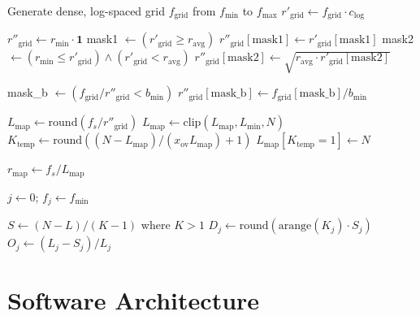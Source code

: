 \documentclass[final, 5p, times, twocolumn, number, sort&compress]{elsarticle}
\begin{document}
\begin{algorithm}[ht!]
\small
\caption{The Vectorized LTF Scheduler}
\label{alg:vectorized-ltf}


Generate dense, log-spaced grid $f_{\text{grid}}$ from $f_{\min}$ to $f_{\max}$\;
$r'_{\text{grid}} \gets f_{\text{grid}} \cdot c_{\log}$\;

$r''_{\text{grid}} \gets r_{\min} \cdot \mathbf{1}$\;
mask1 $\gets (r'_{\text{grid}} \ge r_{\text{avg}})$\;
$r''_{\text{grid}}[\text{mask1}] \gets r'_{\text{grid}}[\text{mask1}]$\;
mask2 $\gets (r_{\min} \le r'_{\text{grid}}) \land (r'_{\text{grid}} < r_{\text{avg}})$\;
$r''_{\text{grid}}[\text{mask2}] \gets \sqrt{r_{\text{avg}} \cdot r'_{\text{grid}}[\text{mask2}]}$\;

mask\_b $\gets (f_{\text{grid}} / r''_{\text{grid}} < b_{\min})$\;
$r''_{\text{grid}}[\text{mask\_b}] \gets f_{\text{grid}}[\text{mask\_b}] / b_{\min}$\;

$L_{\text{map}} \gets \text{round}(f_s / r''_{\text{grid}})$\;
$L_{\text{map}} \gets \text{clip}(L_{\text{map}}, L_{\min}, N)$\;
$K_{\text{temp}} \gets \text{round}((N - L_{\text{map}}) / (x_{\text{ov}} L_{\text{map}}) + 1)$\;
$L_{\text{map}}[K_{\text{temp}} = 1] \gets N$\;

$r_{\text{map}} \gets f_s / L_{\text{map}}$\;

$j \gets 0$; $f_j \gets f_{\min}$\;

$S \gets (N - L) / (K - 1)$ where $K > 1$\;
$D_j \gets \text{round}(\text{arange}(K_j) \cdot S_j)$\;
$O_j \gets (L_j - S_j) / L_j$\;
\end{algorithm}

\section{Software Architecture}
\label{sec:architecture}
\end{document}
